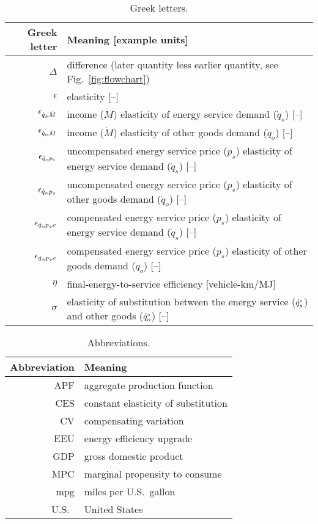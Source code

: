 
\begin{table}
\centering %
\caption{Greek letters.}
\begin{tabular}{r l}
  \toprule
  Greek letter & Meaning [example units] \\
  \midrule
  $\Delta$    & difference (later quantity less earlier quantity, see Fig.~\ref{fig:flowchart}) \\
  $\epsilon$  & elasticity [--] \\
  $\epsilon_{\dot{q}_s\!,\dot{M}}$     & income ($\dot{M}$) elasticity of energy service demand ($\dot{q}_s$) [--] \\
  $\epsilon_{\dot{q}_o\!,\dot{M}}$     & income ($\dot{M}$) elasticity of other goods demand ($\dot{q}_o$) [--] \\
  $\epsilon_{\dot{q}_s\!,p_s}$  & uncompensated energy service price ($p_s$) elasticity of energy service demand ($\dot{q}_s$) [--] \\
  $\epsilon_{\dot{q}_o\!,p_s}$  & uncompensated energy service price ($p_s$) elasticity of other goods demand ($\dot{q}_o$) [--] \\
  $\epsilon_{\dot{q}_s\!,p_s\!,c}$   & compensated energy service price ($p_s$) elasticity of energy service demand ($\dot{q}_s$) [--] \\
  $\epsilon_{\dot{q}_o\!,p_s\!,c}$   & compensated energy service price ($p_s$) elasticity of other goods demand ($\dot{q}_o$) [--] \\
  $\eta$      & final-energy-to-service efficiency [vehicle-km/MJ] \\
  $\sigma$    & elasticity of substitution between the energy service (${}{\dot{q}}^{\scriptscriptstyle \circ}_s$) and other goods (${}{\dot{q}}^{\scriptscriptstyle \circ}_o$) [--] \\
  \bottomrule
\end{tabular}
\label{tab:greek}
\end{table}



\begin{table}
\centering %
\caption{Abbreviations.}
\begin{tabular}{r l}
  \toprule
  Abbreviation & Meaning \\
  \midrule
  APF & aggregate production function \\
  CES & constant elasticity of substitution \\
  CV & compensating variation \\
  EEU & energy efficiency upgrade \\
  GDP & gross domestic product \\
  MPC & marginal propensity to consume \\
  mpg & miles per U.S.\ gallon \\
  U.S.\ & United States \\
  \bottomrule
\end{tabular}
\label{tab:abbreviations}
\end{table}


